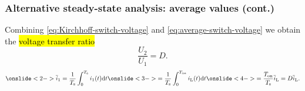 \begin{frame}
    \frametitle{Alternative steady-state analysis: average values (cont.)}
    Combining \eqref{eq:Kirchhoff-switch-voltage} and \eqref{eq:average-switch-voltage} we obtain the \hl{voltage transfer ratio}
    \begin{equation}
        \frac{U_2}{U_1} =  D.
    \end{equation}
    \pause
    \begin{equation}
        \onslide<2->{\overline{i}_1 = \frac{1}{T_\mathrm{s}} \int_{0}^{T_\mathrm{s}} i_1(t) \mathrm{d}t}\onslide<3->{ = \frac{1}{T_\mathrm{s}} \int_{0}^{T_\mathrm{on}} i_\mathrm{L}(t) \mathrm{d}t} \onslide<4->{= \frac{T_\mathrm{on}}{T_\mathrm{s}} \overline{i}_\mathrm{L} = D \overline{i}_\mathrm{L}.}
    \end{equation}%
\end{frame}

